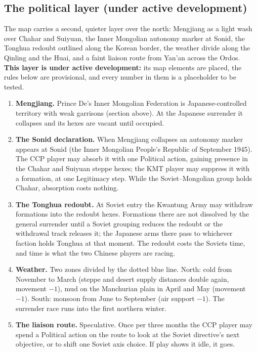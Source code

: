 \documentclass[11pt]{article}
\begin{document}
\subsection{The political layer (under active development)}
The map carries a second, quieter layer over the north: Mengjiang as a light wash over Chahar and Suiyuan, the Inner Mongolian autonomy marker at Sonid, the Tonghua redoubt outlined along the Korean border, the weather divide along the Qinling and the Huai, and a faint liaison route from Yan'an across the Ordos. \textbf{This layer is under active development:} its map elements are placed, the rules below are provisional, and every number in them is a placeholder to be tested.
\begin{enumerate}
\item \textbf{Mengjiang.} Prince De's Inner Mongolian Federation is Japanese-controlled territory with weak garrisons (section above). At the Japanese surrender it collapses and its hexes are vacant until occupied.
\item \textbf{The Sonid declaration.} When Mengjiang collapses an autonomy marker appears at Sonid (the Inner Mongolian People's Republic of September 1945). The CCP player may absorb it with one Political action, gaining presence in the Chahar and Suiyuan steppe hexes; the KMT player may suppress it with a formation, at one Legitimacy step. While the Soviet--Mongolian group holds Chahar, absorption costs nothing.
\item \textbf{The Tonghua redoubt.} At Soviet entry the Kwantung Army may withdraw formations into the redoubt hexes. Formations there are not dissolved by the general surrender until a Soviet grouping reduces the redoubt or the withdrawal track releases it; the Japanese arms there pass to whichever faction holds Tonghua at that moment. The redoubt costs the Soviets time, and time is what the two Chinese players are racing.
\item \textbf{Weather.} Two zones divided by the dotted blue line. North: cold from November to March (steppe and desert supply distances double again, movement $-1$), mud on the Manchurian plain in April and May (movement $-1$). South: monsoon from June to September (air support $-1$). The surrender race runs into the first northern winter.
\item \textbf{The liaison route.} Speculative. Once per three months the CCP player may spend a Political action on the route to look at the Soviet directive's next objective, or to shift one Soviet axis choice. If play shows it idle, it goes.
\end{enumerate}
\end{document}
